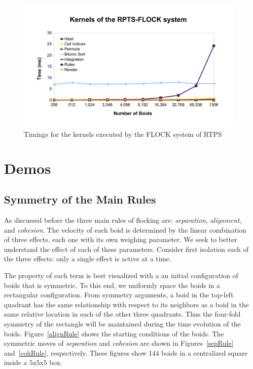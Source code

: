 \begin{figure}[htbp]
\begin{center}
\includegraphics[scale=0.7]{figures/kernelsPlot.pdf}
\caption{Timings for the kernels executed by the FLOCK system of RTPS}
\label{kernelBench}
\end{center}
\end{figure}


\section{Demos}

\subsection{Symmetry of the Main Rules}
As discussed before the three main rules of flocking are: \textit{separation}, \textit{alignment}, and \textit{cohesion}. The velocity of each boid is determined by the linear combination of three effects, each one with its own weighing parameter. We seek to better understand the effect of each of these parameters. Consider first isolation each of the three effects: only a single effect is active at a time. 

The property of each term is best visualized with a an initial configuration of boids that is symmetric. To this end, we uniformly space the boids in a rectangular configuration.  From symmetry arguments, a boid in the top-left quadrant has the same relationship with respect to its neighbors as a boid in the same relative location in each of the other three quadrants. Thus the four-fold symmetry of the rectangle will be maintained during the time evolution of the boids. Figure~\ref{alignRule} shows the starting conditions of the boids. The symmetric moves of \textit{separation} and \textit{cohesion} are shown in Figures~\ref{sepRule} and~\ref{cohRule}, respectively. These figures show 144 boids in a centralized square inside a $5$x$5$x$5$ box.

